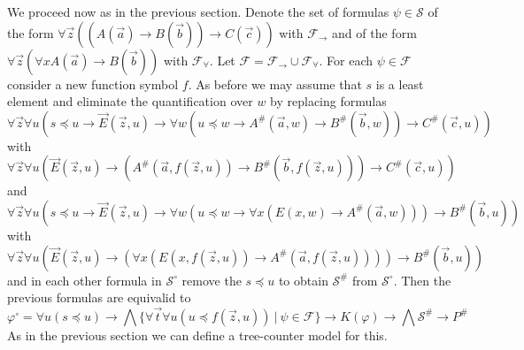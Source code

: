 \documentclass[a4paper,UKenglish,cleveref, autoref, thm-restate]{lipics-v2021}
\begin{document}
We proceed now as in the previous section. Denote the set of formulas $\psi\in\mathcal S$ of the form $\forall\vec z((A(\vec a)\to B(\vec b))\to C(\vec c))$ with $\mathcal F_\to$ and of the form $\forall \vec z(\forall xA(\vec a)\to B(\vec b))$ with $\mathcal F_\forall$. Let $\mathcal F = \mathcal F_\to\cup\mathcal F_\forall$. For each  $\psi\in\mathcal F$ consider a new function symbol $f$. As before we may assume that $s$ is a least element and eliminate the quantification over $w$ by replacing formulas
$$\forall \vec z\forall u(s\preceq u\to\vec E(\vec z, u)\to \forall w(u\preceq w\to A^\#(\vec a, w)\to B^\#(\vec b, w))\to C^\#(\vec c, u))$$ with
$$\forall \vec z\forall u(\vec E(\vec z, u)\to (A^\#(\vec a, f(\vec z, u))\to B^\#(\vec b, f(\vec z, u)))\to C^\#(\vec c, u))$$ and
$$\forall \vec z\forall u(s\preceq u\to\vec E(\vec z, u)\to \forall w(u\preceq w\to \forall x(E(x, w)\to A^\#(\vec a, w)))\to B^\#(\vec b, u))$$ with $$\forall \vec z\forall u(\vec E(\vec z, u)\to (\forall x(E(x, f(\vec z, u))\to A^\#(\vec a, f(\vec z, u))))\to B^\#(\vec b, u))$$
and in each other formula in $\mathcal S^\circ$ remove the $s\preceq u$ to obtain $\mathcal S^\#$ from $\mathcal S^\circ$. Then the previous formulas are equivalid to
$$\varphi^\circ= \forall u(s\preceq u)\to \bigwedge\{\forall \vec t\forall u(u\preceq f(\vec z, u))\:|\:\psi\in\mathcal F\}\to K(\varphi)\to\bigwedge\mathcal S^\#\to P^\#$$
As in the previous section we can define a tree-counter model for this.
\end{document}

